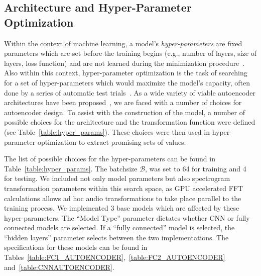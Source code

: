 \documentclass[\main/thesis.tex]{subfiles}
\begin{document}
\subsection{Architecture and Hyper-Parameter Optimization}

Within the context of machine learning, a model's \emph{hyper-parameters} are fixed parameters which are set before the training begins (e.g., number of layers, size of layers, loss function) and are not learned during the minimization procedure~\cite{bengio2000gradient}. Also within this context, hyper-parameter optimization is the task of searching for a set of hyper-parameters which would maximize the model's capacity, often done by a series of automatic test trials~\cite{bengio2000gradient,bergstra2011algorithms,bergstra2012random}. As a wide variety of viable autoencoder architectures have been proposed~\cite{aouameur2019neural,esling2018generative,gensler2016deep,zhang2016facing,pu2016variational}, we are faced with a number of choices for autoencoder design. To assist with the construction of the model, a number of possible choices for the architecture and the transformation function were defined (see Table~\ref{table:hyper_params}). These choices were then used in hyper-parameter optimization to extract promising sets of values. 

The list of possible choices for the hyper-parameters can be found in Table~\ref{table:hyper_params}. The batchsize $\mathcal{B}$, was set to 64 for training and 4 for testing. We included not only model parameters but also spectrogram transformation parameters within this search space, as GPU accelerated FFT calculations allows ad hoc audio transformations to take place parallel to the training process. We implemented 3 base models which are affected by these hyper-parameters. The \enquote{Model Type} parameter dictates whether CNN or fully connected models are selected. If a \enquote{fully connected} model is selected, the \enquote{hidden layers} parameter selects between the two implementations. The specifications for these models can be found in Tables~\ref{table:FC1_AUTOENCODER},~\ref{table:FC2_AUTOENCODER} and~\ref{table:CNNAUTOENCODER}.
\end{document}
